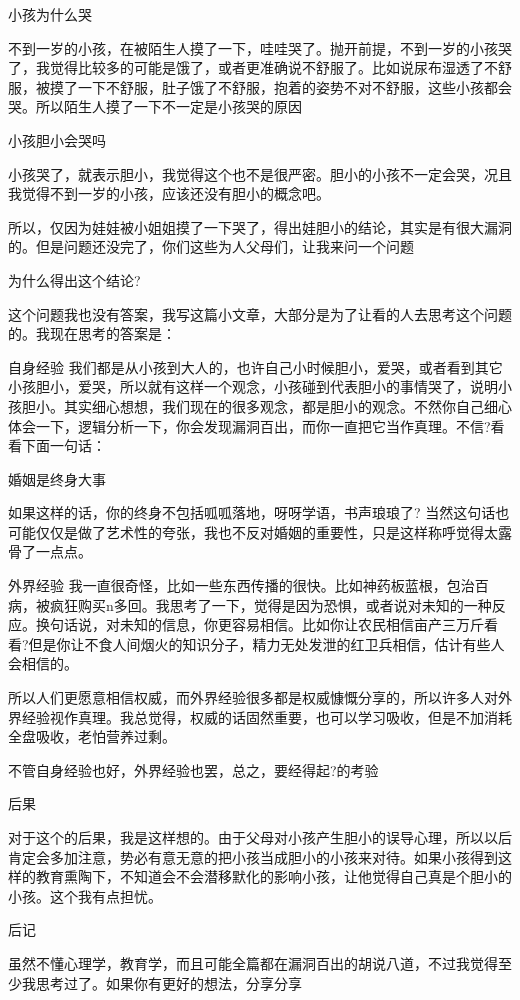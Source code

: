 小孩为什么哭

不到一岁的小孩，在被陌生人摸了一下，哇哇哭了。抛开前提，不到一岁的小孩哭了，我觉得比较多的可能是饿了，或者更准确说不舒服了。比如说尿布湿透了不舒服，被摸了一下不舒服，肚子饿了不舒服，抱着的姿势不对不舒服，这些小孩都会哭。所以陌生人摸了一下不一定是小孩哭的原因

小孩胆小会哭吗

小孩哭了，就表示胆小，我觉得这个也不是很严密。胆小的小孩不一定会哭，况且我觉得不到一岁的小孩，应该还没有胆小的概念吧。

所以，仅因为娃娃被小姐姐摸了一下哭了，得出娃胆小的结论，其实是有很大漏洞的。但是问题还没完了，你们这些为人父母们，让我来问一个问题

为什么得出这个结论?

这个问题我也没有答案，我写这篇小文章，大部分是为了让看的人去思考这个问题的。我现在思考的答案是：

自身经验
我们都是从小孩到大人的，也许自己小时候胆小，爱哭，或者看到其它小孩胆小，爱哭，所以就有这样一个观念，小孩碰到代表胆小的事情哭了，说明小孩胆小。其实细心想想，我们现在的很多观念，都是胆小的观念。不然你自己细心体会一下，逻辑分析一下，你会发现漏洞百出，而你一直把它当作真理。不信?看看下面一句话：

婚姻是终身大事

如果这样的话，你的终身不包括呱呱落地，呀呀学语，书声琅琅了? 当然这句话也可能仅仅是做了艺术性的夸张，我也不反对婚姻的重要性，只是这样称呼觉得太露骨了一点点。

外界经验
我一直很奇怪，比如一些东西传播的很快。比如神药板蓝根，包治百病，被疯狂购买n多回。我思考了一下，觉得是因为恐惧，或者说对未知的一种反应。换句话说，对未知的信息，你更容易相信。比如你让农民相信亩产三万斤看看?但是你让不食人间烟火的知识分子，精力无处发泄的红卫兵相信，估计有些人会相信的。

所以人们更愿意相信权威，而外界经验很多都是权威慷慨分享的，所以许多人对外界经验视作真理。我总觉得，权威的话固然重要，也可以学习吸收，但是不加消耗全盘吸收，老怕营养过剩。

不管自身经验也好，外界经验也罢，总之，要经得起?的考验

后果

对于这个的后果，我是这样想的。由于父母对小孩产生胆小的误导心理，所以以后肯定会多加注意，势必有意无意的把小孩当成胆小的小孩来对待。如果小孩得到这样的教育熏陶下，不知道会不会潜移默化的影响小孩，让他觉得自己真是个胆小的小孩。这个我有点担忧。

后记

虽然不懂心理学，教育学，而且可能全篇都在漏洞百出的胡说八道，不过我觉得至少我思考过了。如果你有更好的想法，分享分享
